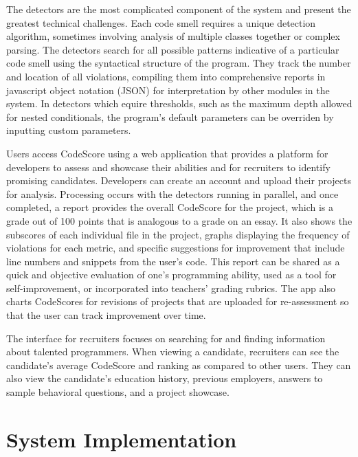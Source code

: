 \documentclass{sig-alternate}
\begin{document}
The detectors are the most complicated component of the system and present the
greatest technical challenges. Each code smell requires a unique detection
algorithm, sometimes involving analysis of multiple classes together or complex
parsing. The detectors search for all possible patterns indicative of a
particular code smell using the syntactical structure of the program. They track the number and location of all 
violations, compiling them into comprehensive reports in javascript object notation (JSON) for interpretation by
other modules in the system. In detectors which equire thresholds, 
such as the maximum depth allowed for nested conditionals, the program's default
parameters can be overriden by inputting custom parameters.

Users access CodeScore using a web application that provides a platform for
developers to assess and showcase their abilities and for recruiters to identify
promising candidates. Developers can create an account
and upload their projects for analysis. Processing occurs with the detectors
running in parallel, and once completed, a report
provides the overall CodeScore for the project, which is a grade out of 100
points that is analogous to a grade on an essay. It also shows the subscores of each
individual file in the project, graphs displaying the frequency of violations
for each metric, and specific suggestions for improvement that include line
numbers and snippets from the user's code. This report can be shared as a quick and objective
evaluation of one's programming ability, used as a tool for
self-improvement, or incorporated into teachers' grading rubrics. The app also charts CodeScores for revisions
of projects that are uploaded for re-assessment so that the user can track
improvement over time.

The interface for recruiters focuses on searching for and finding information
about talented programmers. When viewing a candidate, recruiters can see the candidate's average
CodeScore and ranking as compared to other users. They can also view the
candidate's education history, previous employers, answers to sample behavioral
questions, and a project showcase. 

\section{System Implementation}
\label{subsec:approach}
\end{document}
